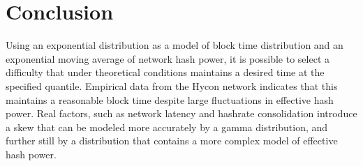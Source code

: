 \documentclass[]{article}
\begin{document}
\section{Conclusion}
Using an exponential distribution as a model of block time distribution and an exponential moving average of network hash power, it is possible to select a difficulty that under theoretical conditions maintains a desired time at the specified quantile.  Empirical data from the Hycon network indicates that this maintains a reasonable block time despite large fluctuations in effective hash power.  Real factors, such as network latency and hashrate consolidation introduce a skew that can be modeled more accurately by a gamma distribution, and further still by a distribution that contains a more complex model of effective hash power. 



\end{document}
